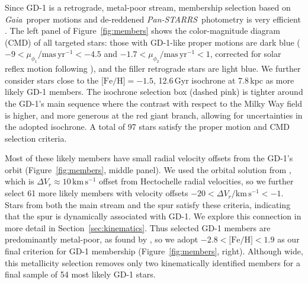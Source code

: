 \documentclass[twocolumn]{aastex63}
\newcommand{\gaia}{\textsl{Gaia}}
\newcommand{\pans}{\textsl{Pan-STARRS}}
\newcommand{\kms}{\ensuremath{\textrm{km}\,\textrm{s}^{-1}}}
\newcommand{\masyr}{\ensuremath{\textrm{mas}\,\textrm{yr}^{-1}}}
\newcommand{\feh}{\ensuremath{\textrm{[Fe/H]}}}
\begin{document}
Since GD-1 is a retrograde, metal-poor stream, membership selection based on \gaia\ proper motions \citep{gdr2} and de-reddened \pans\ photometry \citep{sfd, ps1} is very efficient \citep[e.g.,][]{pwb}.
The left panel of Figure~\ref{fig:members} shows the color-magnitude diagram (CMD) of all targeted stars: those with GD-1-like proper motions are dark blue ($-9<\mu_{\phi_1}/\masyr<-4.5$ and $-1.7<\mu_{\phi_2}/\masyr<1$, corrected for solar reflex motion following \citealt{pwb}), and the filler retrograde stars are light blue.
We further consider stars close to the $\textrm{[Fe/H]}=-1.5$, 12.6\,Gyr isochrone at 7.8\,kpc \citep{choi2016} as more likely GD-1 members.
The isochrone selection box (dashed pink) is tighter around the GD-1's main sequence where the contrast with respect to the Milky Way field is higher, and more generous at the red giant branch, allowing for uncertainties in the adopted isochrone.
A total of 97 stars satisfy the proper motion and CMD selection criteria.

Most of these likely members have small radial velocity offsets from the GD-1's orbit (Figure~\ref{fig:members}, middle panel).
We used the orbital solution from \citet{pwb}, which is $\Delta V_r\approx10\,\kms$ offset from Hectochelle radial velocities, so we further select 61 more likely members with velocity offsets $-20 < \Delta V_r / \kms < -1$.
Stars from both the main stream and the spur satisfy these criteria, indicating that the spur is dynamically associated with GD-1.
We explore this connection in more detail in Section~\ref{sec:kinematics}.
% 
Thus selected GD-1 members are predominantly metal-poor, as found by \citet{malhan2019}, so we adopt $-2.8<\feh<1.9$ as our final criterion for GD-1 membership (Figure~\ref{fig:members}, right).
Although wide, this metallicity selection removes only two kinematically identified members for a final sample of 54 most likely GD-1 stars.
\end{document}
